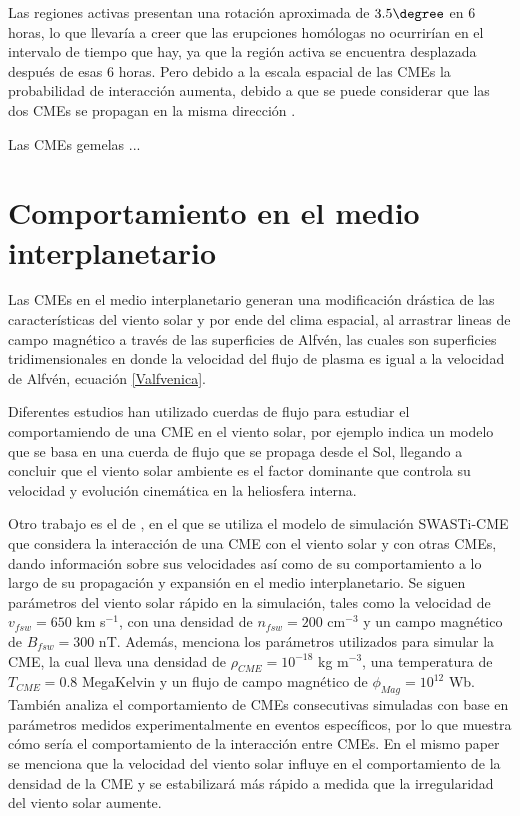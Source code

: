 Las regiones activas presentan una rotación aproximada de $3.5\degree$ en 6 horas, lo que llevaría a creer que las erupciones homólogas no ocurrirían en el intervalo de tiempo que hay, ya que la región activa se encuentra desplazada después de esas 6 horas. Pero debido a la escala espacial de las \acp{CME} la probabilidad de interacción aumenta, debido a que se puede considerar que las dos CMEs se propagan en la misma dirección \parencite[e.g.,][]{lugaz-2005}.

Las CMEs gemelas ...

\section{Comportamiento en el medio interplanetario}
Las \acp{CME} en el medio interplanetario generan una modificación drástica de las características del viento solar y por ende del clima espacial, al arrastrar lineas de campo magnético a través de las superficies de Alfvén, las cuales son superficies tridimensionales en donde la velocidad del flujo de plasma es igual a la velocidad de Alfvén, ecuación \eqref{Valfvenica}. 

Diferentes estudios han utilizado cuerdas de flujo para estudiar el comportamiendo de una CME en el viento solar, por ejemplo \textcite[][]{singh-2025} indica un modelo que se basa en una cuerda de flujo que se propaga desde el Sol, llegando a concluir que el viento solar ambiente es el factor dominante que controla su velocidad y evolución cinemática en la heliosfera interna. 

Otro trabajo es el de \textcite[][]{mayank-2023}, en el que se utiliza el modelo de simulación SWASTi-CME que considera la interacción de una CME con el viento solar y con otras CMEs, dando información sobre sus velocidades así como de su comportamiento a lo largo de su propagación y expansión en el medio interplanetario. Se siguen parámetros del viento solar rápido en la simulación, tales como la velocidad de $v_{fsw}=650$ km s$^{-1}$, con una densidad de $n_{fsw}=200$ cm$^{-3}$ y un campo magnético de $B_{fsw}=300$ nT. Además, menciona los parámetros utilizados para simular la \ac{CME}, la cual lleva una densidad  de $\rho_{CME}=10^{-18}$ kg m$^{-3}$, una temperatura de $T_{CME}=0.8$ MegaKelvin y un flujo de campo magnético de $\phi_{Mag}=10^{12}$ Wb. También analiza el comportamiento de CMEs consecutivas simuladas con base en parámetros medidos experimentalmente en eventos específicos, por lo que muestra cómo sería el comportamiento de la interacción entre CMEs. En el mismo paper se menciona que la velocidad del viento solar influye en el comportamiento de la densidad de la CME y se estabilizará más rápido a medida que la irregularidad del viento solar aumente.

